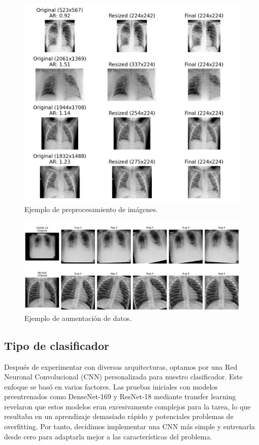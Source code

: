\documentclass[es]{uc3mreport}
\begin{document}
\begin{report}
    \begin{figure}[H]
        \centering
        \includegraphics[width=1\textwidth]{transforms1.png}
        \caption{Ejemplo de preprocesamiento de imágenes.}
        \label{fig:preprocessing}
    \end{figure}

    \begin{figure}[H]
        \centering
        \includegraphics[width=1\textwidth]{transforms2.png}
        \caption{Ejemplo de aumentación de datos.}
        \label{fig:augmentation}
    \end{figure}
    
    \subsection{Tipo de clasificador}
    
    Después de experimentar con diversas arquitecturas, optamos por una Red Neuronal Convolucional (CNN) personalizada para nuestro clasificador. Este enfoque se basó en varios factores. Las pruebas iniciales con modelos preentrenados como DenseNet-169 y ResNet-18 mediante transfer learning revelaron que estos modelos eran excesivamente complejos para la tarea, lo que resultaba en un aprendizaje demasiado rápido y potenciales problemas de overfitting. Por tanto, decidimos implementar una CNN más simple y entrenarla desde cero para adaptarla mejor a las características del problema.
    

\end{report}
\end{document}
